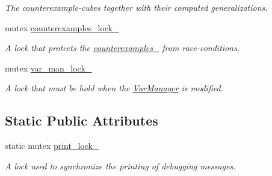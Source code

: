 \begin{DoxyCompactItemize}
\begin{DoxyCompactList}\small\item\em The counterexample-\/cubes together with their computed generalizations. \end{DoxyCompactList}\item 
mutex \hyperlink{classParallelLearner_a454c81908f2d3cb4c24b042739adc4ec}{counterexamples\-\_\-lock\-\_\-}
\begin{DoxyCompactList}\small\item\em A lock that protects the \hyperlink{classParallelLearner_a974943e3e2145b3407f689b64acdd33f}{counterexamples\-\_\-} from race-\/conditions. \end{DoxyCompactList}\item 
mutex \hyperlink{classParallelLearner_abdd409a5ef29bd4ba6b7213e9d4a067b}{var\-\_\-man\-\_\-lock\-\_\-}
\begin{DoxyCompactList}\small\item\em A lock that must be hold when the \hyperlink{classVarManager}{Var\-Manager} is modified. \end{DoxyCompactList}\end{DoxyCompactItemize}
\subsection*{Static Public Attributes}
\begin{DoxyCompactItemize}
\item 
static mutex \hyperlink{classParallelLearner_a5bc71a2c35fa976d792bf0e80de31a39}{print\-\_\-lock\-\_\-}
\begin{DoxyCompactList}\small\item\em A lock used to synchronize the printing of debugging messages. \end{DoxyCompactList}\end{DoxyCompactItemize}
